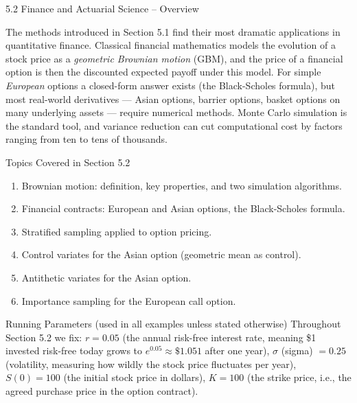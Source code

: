 \documentclass[aspectratio=169,10pt]{beamer}
\begin{document}
\begin{frame}[allowframebreaks]{5.2 Finance and Actuarial Science -- Overview}

The methods introduced in Section 5.1 find their most dramatic applications in
quantitative finance.  Classical financial mathematics models the evolution of a
stock price as a \emph{geometric Brownian motion} (GBM), and the price of a
financial option is then the discounted expected payoff under this model.  For
simple \emph{European} options a closed-form answer exists (the Black-Scholes
formula), but most real-world derivatives --- Asian options, barrier options,
basket options on many underlying assets --- require numerical methods.  Monte
Carlo simulation is the standard tool, and variance reduction can cut
computational cost by factors ranging from ten to tens of thousands.

\begin{block}{Topics Covered in Section 5.2}
  \begin{enumerate}
    \item Brownian motion: definition, key properties, and two simulation algorithms.
    \item Financial contracts: European and Asian options, the Black-Scholes formula.
    \item Stratified sampling applied to option pricing.
    \item Control variates for the Asian option (geometric mean as control).
    \item Antithetic variates for the Asian option.
    \item Importance sampling for the European call option.
  \end{enumerate}
\end{block}

\begin{block}{Running Parameters (used in all examples unless stated otherwise)}
  Throughout Section 5.2 we fix:
  $r = 0.05$ (the annual risk-free interest rate, meaning \$1 invested risk-free
  today grows to $e^{0.05} \approx \$1.051$ after one year),
  $\sigma$ (sigma) $= 0.25$ (volatility, measuring how wildly the stock price
  fluctuates per year),
  $S(0) = 100$ (the initial stock price in dollars),
  $K = 100$ (the strike price, i.e., the agreed purchase price in the option contract).
\end{block}

\end{frame}

\end{document}
